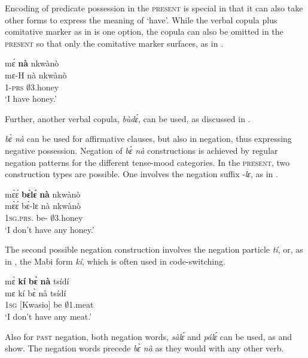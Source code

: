Encoding of predicate possession in the \textsc{present} is special in that it can also take other forms to express the meaning of `have'. While the verbal copula plus comitative marker as in  is one option, the copula can also be omitted in the \textsc{present} so that only the comitative marker surfaces, as in .

\ea\label{bena1a}
  \glll  mɛ́ {\bfseries nà} nkwànò  \\
        mɛ-H nà nkwànò \\
           1-\textsc{prs} {\COM} $\emptyset$3.honey\\
    \trans `I have honey.'
\z

\noindent Further, another verbal copula, {\itshape bùdɛ́}, can be used, as discussed in .

{\itshape bɛ̀ nà} can be used for affirmative clauses, but also in negation, thus expressing negative possession. Negation of {\itshape bɛ̀ nà} constructions is achieved by regular negation patterns for the different tense-mood categories. In the \textsc{present}, two construction types are possible. One involves the negation suffix -{\itshape lɛ}, as in .


\ea \label{beNEG1}
  \glll mɛ̀ɛ́ {\bfseries bɛ́lɛ́} {\bfseries nà} nkwànò \\
       mɛ̀ɛ́ bɛ̀-lɛ nà nkwànò \\
       1\textsc{sg}.\textsc{prs}.{\NEG} be-{\NEG} {\COM} $\emptyset$3.honey\\
    \trans `I don't have any honey.'
\z

\noindent The second possible negation construction involves the negation particle {\itshape tí}, or, as in , the Mabi form {\itshape kí}, which is often used in code-switching.

\ea \label{beNEG2}
  \glll mɛ̀ {\bfseries kí} {\bfseries bɛ̀} {\bfseries nà} tsídí \\
       mɛ kí bɛ̀ nà tsídí \\
       1\textsc{sg} {\NEG}[Kwasio] be {\COM} $\emptyset$1.meat\\
    \trans `I don't have any meat.'
\z

Also for \textsc{past} negation, both negation words, {\itshape sàlɛ́} and {\itshape pálɛ́} can be used, as  and  show. The negation words precede {\itshape bɛ̀ nà} as they would with any other verb.

